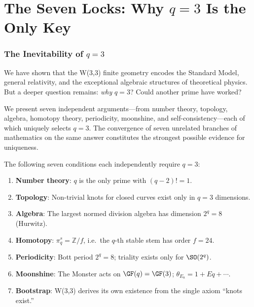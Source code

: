 \clearpage
\part{\texorpdfstring{The Seven Locks: Why $q=3$ Is the Only Key}{The Seven Locks: Why q=3 Is the Only Key}}

\section{\texorpdfstring{The Inevitability of $q=3$}{The Inevitability of q=3}}
\label{sec:inevitability}

We have shown that the W(3,3) finite geometry encodes
the Standard Model, general relativity, and the exceptional
algebraic structures of theoretical physics.
But a deeper question remains: \emph{why} $q=3$?
Could another prime have worked?

We present seven independent arguments---from number theory,
topology, algebra, homotopy theory, periodicity, moonshine,
and self-consistency---each of which uniquely selects $q=3$.
The convergence of seven unrelated branches of mathematics
on the same answer constitutes the strongest possible
evidence for uniqueness.

\begin{theorem}
\label{thm:seven-locks}
The following seven conditions each independently require $q=3$:
\begin{enumerate}
\item \textbf{Number theory}: $q$ is the only prime with $(q{-}2)!=1$.
\item \textbf{Topology}: Non-trivial knots for closed curves exist only in $q=3$ dimensions.
\item \textbf{Algebra}: The largest normed division algebra has dimension $2^q=8$ (Hurwitz).
\item \textbf{Homotopy}: $\pi_q^s = \mathbb{Z}/f$, i.e.\ the $q$-th stable stem has order $f=24$.
\item \textbf{Periodicity}: Bott period $2^q=8$; triality exists only for $\SO(2^q)$.
\item \textbf{Moonshine}: The Monster acts on $\GF(q)=\GF(3)$; $\theta_{E_8}=1+Eq+\cdots$.
\item \textbf{Bootstrap}: W(3,3) derives its own existence from the single axiom ``knots exist.''
\end{enumerate}
\end{theorem}


